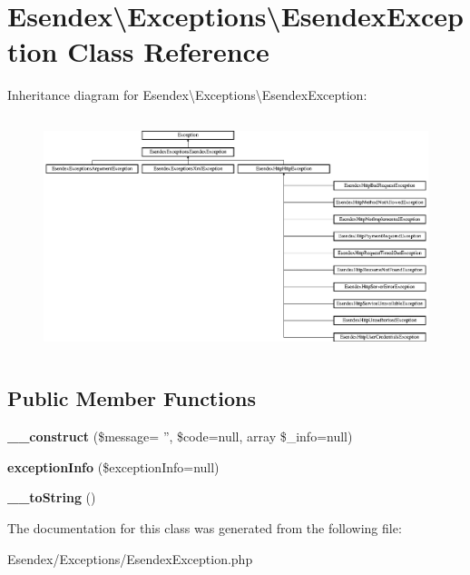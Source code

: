 \section{Esendex\textbackslash{}Exceptions\textbackslash{}Esendex\-Exception Class Reference}
\label{class_esendex_1_1_exceptions_1_1_esendex_exception}
Inheritance diagram for Esendex\textbackslash{}Exceptions\textbackslash{}Esendex\-Exception\-:\begin{figure}[H]
\begin{center}
\leavevmode
\includegraphics[height=6.920152cm]{class_esendex_1_1_exceptions_1_1_esendex_exception}
\end{center}
\end{figure}
\subsection*{Public Member Functions}
\begin{DoxyCompactItemize}
\item 
{\bfseries \-\_\-\-\_\-construct} (\$message= '', \$code=null, array \$\-\_\-info=null)\label{class_esendex_1_1_exceptions_1_1_esendex_exception_a3633dbd0b461b82e32f03e225dbc0c5b}

\item 
{\bfseries exception\-Info} (\$exception\-Info=null)\label{class_esendex_1_1_exceptions_1_1_esendex_exception_a2e641acd8e669a5ab24b25fe61025c30}

\item 
{\bfseries \-\_\-\-\_\-to\-String} ()\label{class_esendex_1_1_exceptions_1_1_esendex_exception_ad769e97e92631de12275bf6a7c16fce6}

\end{DoxyCompactItemize}


The documentation for this class was generated from the following file\-:\begin{DoxyCompactItemize}
\item 
Esendex/\-Exceptions/Esendex\-Exception.\-php\end{DoxyCompactItemize}

